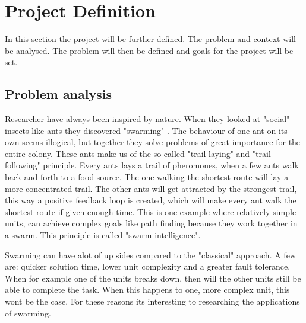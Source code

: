 \documentclass[10pt,a4paper]{article}
\begin{document}
\section{Project Definition}
In this section the project will be further defined. The problem and context will be analysed. The problem will then be defined and goals for the project will be set.

\subsection{Problem analysis}
Researcher have always been inspired by nature. When they looked at "social" insects like ants they discovered "swarming"\cite{swarmwiki} . The behaviour of one ant on its own seems illogical, but together they solve problems of great importance for the entire colony. These ants make us of the so called "trail laying" and "trail following" principle. Every ants lays a trail of pheromones, when a few ants walk back and forth to a food source. The one walking the shortest route will lay a more concentrated trail. The other ants will get attracted by the strongest trail, this way a positive feedback loop is created, which will make every ant walk the shortest route if given enough time. This is one example where relatively simple units, can achieve complex goals like path finding because they work together in a swarm. This principle is called "swarm intelligence"\cite{swarmintelligence}.

Swarming can have alot of up sides compared to the "classical" approach. A few are: quicker solution time, lower unit complexity and a greater fault tolerance\cite{swarmintelligence}. When for example one of the units breaks down, then will the other units still be able to complete the task. When this happens to one, more complex unit, this wont be the case. For these reasons its interesting to researching the applications of swarming.
\end{document}
